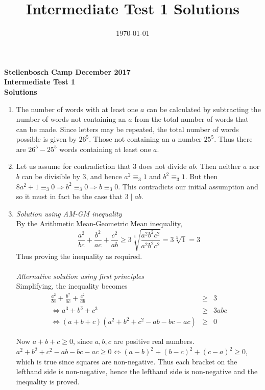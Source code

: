 \documentclass[11pt]{article}
\title{\textbf{Intermediate Test 1 Solutions}}
\date{\today}
\begin{document}
\begin{center}
\textbf{Stellenbosch Camp December 2017 \\ Intermediate Test 1} \\
\textbf{Solutions}
\end{center}

\begin{enumerate}


\item The number of words with at least one $a$ can be calculated by subtracting the number of words not containing an $a$ from the total number of words that can be made. Since letters may be repeated, the total number of words possible is given by $26^5$. Those not containing an $a$ number $25^5$. Thus there are $26^5-25^5$ words containing at least one $a$.


\item Let us assume for contradiction that 3 does not divide $ab$. Then neither $a$ nor $b$ can be divisible by 3, and hence $a^2 \equiv_3 1$ and $b^2 \equiv_3 1$. But then $8a^2+1\equiv_3 0 \Rightarrow b^2\equiv_3 0 \Rightarrow b\equiv_3 0$. This contradicts our initial assumption and so it must in fact be the case that $3\mid ab$.


\item \textit{Solution using AM-GM inequality} \\
By the Arithmetic Mean-Geometric Mean inequality,
\begin{equation*}
\frac{a^2}{bc}+\frac{b^2}{ac}+\frac{c^2}{ab} \geq 3\sqrt[3]{\frac{a^2b^2c^2}{a^2b^2c^2}} = 3\sqrt[3]{1}=3
\end{equation*}
Thus proving the inequality as required. \\ \\
\textit{Alternative solution using first principles} \\
Simplifying, the inequality becomes
\begin{eqnarray*}
\frac{a^2}{bc}+\frac{b^2}{ac}+\frac{c^2}{ab} & \geq & 3 \\
\Leftrightarrow a^3+b^3+c^3 & \geq & 3abc \\
\Leftrightarrow (a+b+c)(a^2+b^2+c^2-ab-bc-ac) & \geq & 0
\end{eqnarray*}

Now $a+b+c \geq 0$, since $a,b,c$ are positive real numbers. $a^2+b^2+c^2-ab-bc-ac \geq 0 \Leftrightarrow (a-b)^2 + (b-c)^2 + (c-a)^2 \geq 0$, which is true since squares are non-negative. Thus each bracket on the lefthand side is non-negative, hence the lefthand side is non-negative and the inequality is proved.
 

\end{enumerate}
\end{document}
